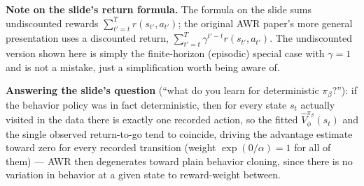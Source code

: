 \textbf{Note on the slide's return formula.} The formula on the slide sums undiscounted rewards $\sum_{t'=t}^T r(s_{t'},a_{t'})$; the original AWR paper's more general presentation uses a discounted return, $\sum_{t'=t}^T \gamma^{t'-t} r(s_{t'},a_{t'})$. The undiscounted version shown here is simply the finite-horizon (episodic) special case with $\gamma=1$ and is not a mistake, just a simplification worth being aware of.

\textbf{Answering the slide's question} (``what do you learn for deterministic $\pi_\beta$?''): if the behavior policy was in fact deterministic, then for every state $s_t$ actually visited in the data there is exactly one recorded action, so the fitted $\hat V^{\pi_\beta}_\phi(s_t)$ and the single observed return-to-go tend to coincide, driving the advantage estimate toward zero for every recorded transition (weight $\exp(0/\alpha)=1$ for all of them) --- AWR then degenerates toward plain behavior cloning, since there is no variation in behavior at a given state to reward-weight between.
